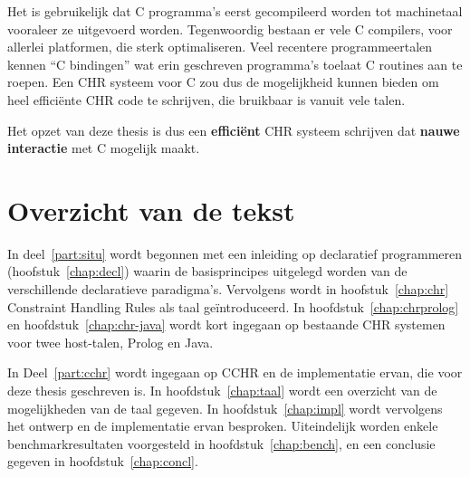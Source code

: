 Het is gebruikelijk dat C programma's eerst gecompileerd worden tot machinetaal vooraleer ze uitgevoerd worden. Tegenwoordig bestaan er vele C compilers, voor allerlei platformen, die sterk optimaliseren. Veel recentere programmeertalen kennen ``C bindingen'' wat erin geschreven programma's toelaat C routines aan te roepen. Een CHR systeem voor C zou dus de mogelijkheid kunnen bieden om heel effici\"ente CHR code te schrijven, die bruikbaar is vanuit vele talen.

Het opzet van deze thesis is dus een {\bf effici\"ent} CHR systeem schrijven dat {\bf nauwe interactie} met C mogelijk maakt.

\section{Overzicht van de tekst}

In deel~\ref{part:situ} wordt begonnen met een inleiding op declaratief programmeren (hoofstuk~\ref{chap:decl}) waarin de basisprincipes uitgelegd worden van de verschillende declaratieve paradigma's. Vervolgens wordt in hoofstuk~\ref{chap:chr} Constraint Handling Rules als taal ge\"introduceerd. In hoofdstuk~\ref{chap:chrprolog} en hoofdstuk~\ref{chap:chr-java} wordt kort ingegaan op bestaande CHR systemen voor twee host-talen, Prolog en Java.

In Deel~\ref{part:cchr} wordt ingegaan op CCHR en de implementatie ervan, die voor deze thesis geschreven is. In hoofdstuk~\ref{chap:taal} wordt een overzicht van de mogelijkheden van de taal gegeven. In hoofdstuk~\ref{chap:impl} wordt vervolgens het ontwerp en de implementatie ervan besproken. Uiteindelijk worden enkele benchmarkresultaten voorgesteld in hoofdstuk~\ref{chap:bench}, en een conclusie gegeven in hoofdstuk~\ref{chap:concl}.
